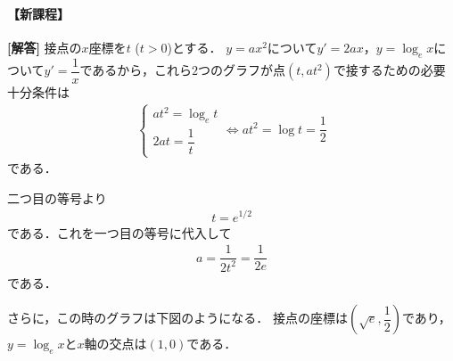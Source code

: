 \documentclass[../../main.tex]{subfiles}
\begin{document}
\begin{oframed}
  
\end{oframed}

\paragraph{【新課程】}
{\bf [解答]}
接点の$x$座標を$t$ ($t>0$)とする．
$y = ax^2$について$y' = 2ax$，$y = \log_e x$について$y' = \dfrac{1}{x}$であるから，これら$2$つのグラフが点$(t, at^2)$で接するための必要十分条件は
\begin{align}
  \begin{cases}
    at^2 = \log_e t \\
    2at = \dfrac{1}{t}
  \end{cases}
  \iff
  at^2 = \log t = \dfrac{1}{2}
\end{align}
である．

二つ目の等号より
\begin{align}
  t = e^{1/2} \label{eq:1}
\end{align}
である．これを一つ目の等号に代入して
\begin{align}
  a = \dfrac{1}{2t^2} = \dfrac{1}{2e} \label{eq:2}
\end{align}
である．

さらに，この時のグラフは下図のようになる．
接点の座標は$\left(\sqrt{e}, \dfrac{1}{2}\right)$であり，$y=\log_e x$と$x$軸の交点は$(1, 0)$である．
\end{document}
